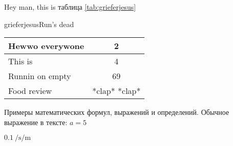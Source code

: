 \documentclass{gostdoc}
\begin{document}
\appendix
\lipsum[4-6]

\appendix
Hey man, this is таблица \ref{tab:grieferjesus}

\begin{inserttable}[1.15]{grieferjesus}{Run's dead}
    \begin{tabular}{|l|c|}
        \hline
        Hewwo everywone & 2             \\
        \hline
        This is         & 4             \\
        \hline
        Runnin on empty & 69            \\
        \hline
        Food review     & *clap* *clap* \\
        \hline
    \end{tabular}
\end{inserttable}

\lipsum[3-5]

Примеры математических формул, выражений и определений. Обычное выражение в тексте: \( a=5 \)

$\displaystyle \SI[]{0.1}{\per\second\per\meter}$
\end{document}

